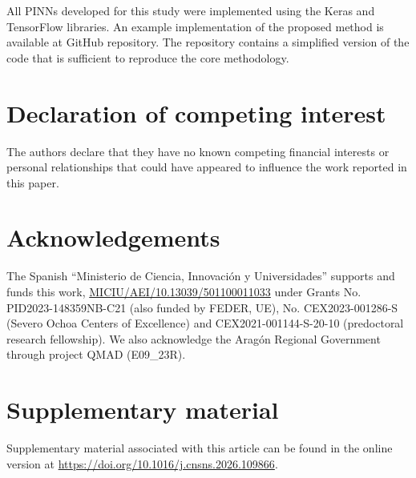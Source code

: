 All PINNs developed for this study were implemented using the Keras and TensorFlow libraries. An example implementation of the proposed method is available at GitHub repository. The repository contains a simplified version of the code that is sufficient to reproduce the core methodology.

\section*{Declaration of competing interest}

The authors declare that they have no known competing financial interests or personal relationships that could have appeared to influence the work reported in this paper.

\section*{Acknowledgements}

The Spanish ``Ministerio de Ciencia, Innovación y Universidades'' supports and funds this work, \url{MICIU/AEI/10.13039/501100011033} under Grants No. PID2023-148359NB-C21 (also funded by FEDER, UE), No. CEX2023-001286-S (Severo Ochoa Centers of Excellence) and CEX2021-001144-S-20-10 (predoctoral research fellowship). We also acknowledge the Aragón Regional Government through project QMAD (E09\_23R).

\section*{Supplementary material}

Supplementary material associated with this article can be found in the online version at \url{https://doi.org/10.1016/j.cnsns.2026.109866}.

\clearpage
